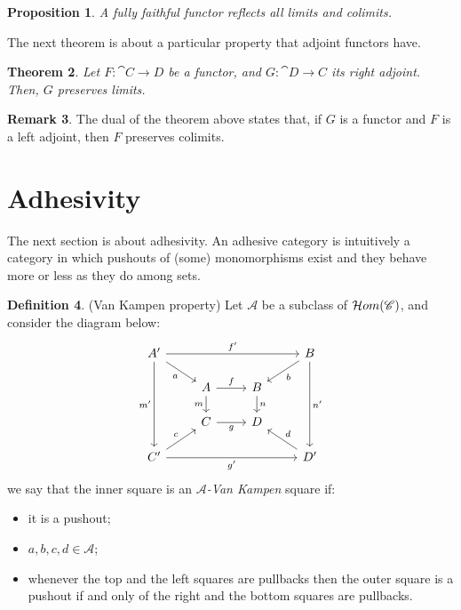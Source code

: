 \documentclass[a4paper, twoside,openright]{report}
\theoremstyle{plain}
\newtheorem{theorem}{Theorem}[section]
\newtheorem{prop}[theorem]{Proposition}
\theoremstyle{definition}
\newtheorem{definition}[theorem]{Definition}
\newtheorem{remark}[theorem]{Remark}
\begin{document}
\begin{prop}\label{prop:inc_funct_reflects_so_limits}
    A fully faithful functor reflects all limits and colimits.
\end{prop}

The next theorem is about a particular property that adjoint functors have.

\begin{theorem}\label{th:adjoints_preserves_lim}
    Let $F: \cat{C \rightarrow D}$ be a functor, and $G: \cat{D \rightarrow C}$ its right adjoint. Then, $G$ preserves limits.
\end{theorem}

\begin{remark}
    The dual of the theorem above states that, if $G$ is a functor and $F$ is a left adjoint, then $F$ preserves colimits.
\end{remark}

\section{Adhesivity}\label{sect:adh}

The next section is about adhesivity.
An adhesive category is intuitively a category in which pushouts of (some) monomorphisms exist and they behave more or less as they do among sets. 

\begin{definition}(Van Kampen property)
    Let $\mathcal A$ be a subclass of $\mathcal{H}om(\mathscr{C})$, and consider the diagram below:
    \[
    \begin{tikzcd}[row sep = scriptsize]
        A' \arrow[ddd, "m'"swap] \arrow[rrr, "f'"] \arrow[dr, "a"swap] & & & B \arrow[ddd, "n'"] \arrow[dl, "b"] \\
        & A \arrow[r, "f"] \arrow[d, "m" swap] & B \arrow[d, "n"]   & \\
        & C \arrow[r, "g" swap]                & D                  & \\
        C' \arrow[rrr, "g'"swap] \arrow[ur, "c"] & & & D' \arrow[ul, "d" swap] 
    \end{tikzcd}
    \]
    we say that the inner square is an \emph{$\mathcal A$-Van Kampen} square if:
    \begin{itemize}
        \item it is a pushout;
        \item $a, b, c, d \in \mathcal{A}$;
        \item whenever the top and the left squares are pullbacks then the outer square is a pushout if and only of the right and the bottom squares are pullbacks.
    \end{itemize}
\end{definition}
\end{document}

